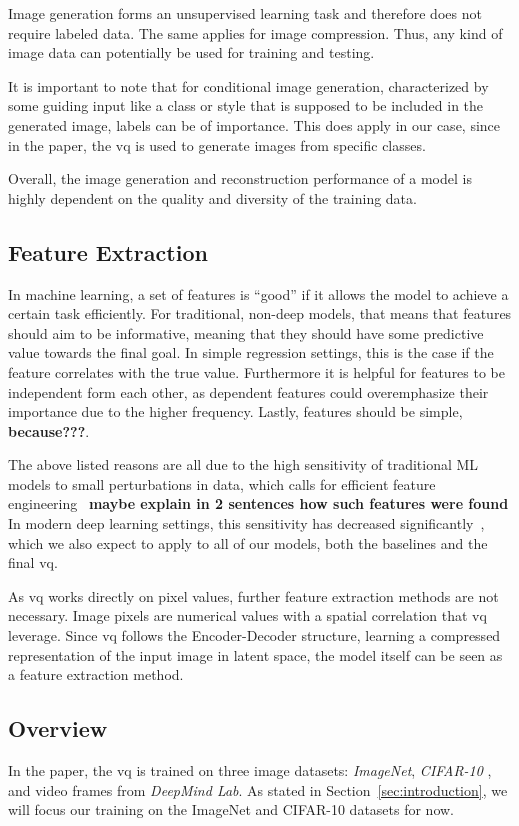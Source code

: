 Image generation forms an unsupervised learning task and therefore does not require labeled data.
The same applies for image compression.
Thus, any kind of image data can potentially be used for training and testing.

It is important to note that for conditional image generation, characterized by some guiding input like a class or
style that is supposed to be included in the generated image, labels can be of importance.
This does apply in our case, since in the paper, the \ac{vq} is used to generate images from specific classes.

Overall, the image generation and reconstruction performance of a model is highly dependent on the quality and diversity
of the training data.

\subsection{Feature Extraction}\label{subsec:feature-extraction}
In machine learning, a set of features is ``good'' if it allows the model to achieve a certain task
efficiently.
For traditional, non-deep models, that means that features should aim to be informative, meaning that
they should have some predictive value towards the final goal.
In simple regression settings, this is the case if the feature correlates with the true value.
Furthermore it is helpful for features to be independent form each other, as dependent features could overemphasize
their importance due to the higher frequency.
Lastly, features should be simple, \textbf{because???}.


The above listed reasons are all due to the high sensitivity of traditional ML models to
small perturbations in data, which calls for efficient feature engineering~\cite{citationNeeded}
\textbf{maybe explain in 2 sentences how such features were found}
In modern deep learning settings, this sensitivity has decreased significantly~\cite{citationNeeded}, which we also
expect to apply to all of our models, both the baselines and the final \ac{vq}.

As \ac{vq} works directly on pixel values, further feature extraction methods are not necessary.
Image pixels are numerical values with a spatial correlation that \ac{vq} leverage.
Since \ac{vq} follows the Encoder-Decoder structure, learning a compressed representation of the input image in latent
space, the model itself can be seen as a feature extraction method.

\subsection{Overview}\label{subsec:dataset-overview}
In the paper, the \ac{vq} is trained on three image datasets: \textit{ImageNet}, \textit{CIFAR-10}
, and video frames from \textit{DeepMind Lab}.
As stated in Section~\ref{sec:introduction}, we will focus our training on the ImageNet and CIFAR-10
datasets for now.

